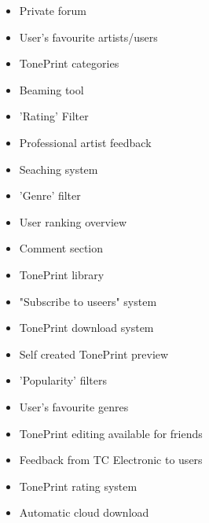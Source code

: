 \begin{itemize}
    \item Private forum
    \item User's favourite artists/users
    \item TonePrint categories
    \item Beaming tool
    \item 'Rating' Filter
    \item Professional artist feedback
    \item Seaching system
    \item 'Genre' filter
    \item User ranking overview
    \item Comment section
    \item TonePrint library
    \item "Subscribe to useers" system
    \item TonePrint download system
    \item Self created TonePrint preview
    \item 'Popularity' filters
    \item User's favourite genres
    \item TonePrint editing available for friends
    \item Feedback from TC Electronic to users
    \item  TonePrint rating system 
    \item Automatic cloud download
\end{itemize}
\pagebreak

